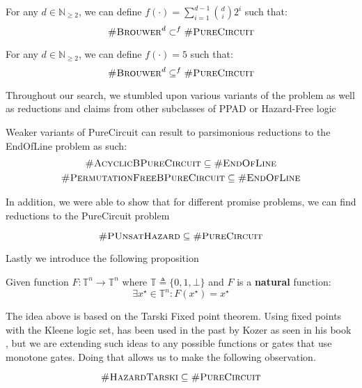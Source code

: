 \begin{corollary}
    For any $d \in \mathbb{N}_{\geq 2}$, we can define $f(\cdot) = \sum_{i = 1}^{d -1}  \binom{d}{i} 2^i$
    such that:
    $$
    \textnormal{\textsc{\#Brouwer}}^{d} \subset^f \textnormal{\textsc{\#PureCircuit}}
    $$ 
\end{corollary}



\begin{theorem}
    For any $d \in \mathbb{N}_{\geq 2}$, we can define $f(\cdot) = 5$
    such that:
    $$
    \textnormal{\textsc{\#Brouwer}}^d \subseteq^f \textnormal{\textsc{\#PureCircuit}}
    $$ 
\end{theorem}


Throughout our search, we stumbled upon
various variants of the problem as well as reductions and claims from other
subclasses of PPAD or Hazard-Free logic

\begin{proposition}
    Weaker variants of PureCircuit can result to parsimonious reductions to the EndOfLine problem
    as such:
    \begin{gather*}
        \textnormal{\textsc{\#AcyclicBPureCircuit}} \subseteq \textnormal{\textsc{\#EndOfLine}} \\
        \textnormal{\textsc{\#PermutationFreeBPureCircuit}} \subseteq \textnormal{\textsc{\#EndOfLine}}
    \end{gather*}
\end{proposition}


In addition, we were able to show that for different promise problems,
we can find reductions to the PureCircuit problem
%
\begin{proposition}
    $$
        \textnormal{\textsc{\#PUnsatHazard}} \subseteq  \textnormal{\textsc{\#PureCircuit}}
    $$
\end{proposition}

Lastly we introduce the following proposition
\begin{proposition}
    Given function $F: \mathbb{T}^n \to \mathbb{T}^n$
    where $\mathbb{T} \triangleq \{0, 1, \bot\}$ and $F$ is a \textbf{natural}
    function:
$$
\exists x^\star \in \mathbb{T}^n: F(x^\star) = x^\star
$$
\end{proposition}
%

The idea above is based on the Tarski Fixed point theorem.
Using fixed points with the Kleene logic set, has been used in the past
by Kozer as seen in his book \cite{kozen2006theory}, but we
are extending such ideas to any possible functions or gates
that use monotone gates. Doing that allows us to make the following observation.

\begin{proposition}
    $$
    \textnormal{\textsc{\#HazardTarski}} \subseteq \textnormal{\textsc{\#PureCircuit}}
    $$
\end{proposition}

